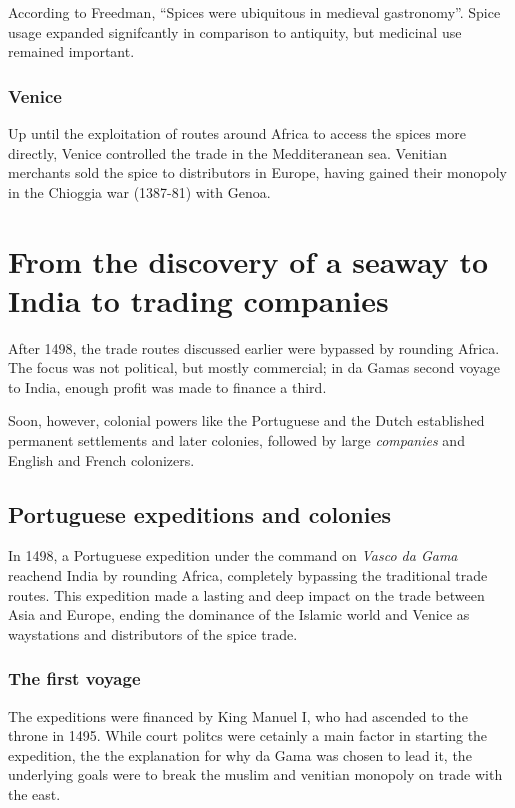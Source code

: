 \documentclass[11pt, a4paper, headings=standardclasses]{scrartcl}
\begin{document}
According to Freedman, ``Spices were ubiquitous in medieval gastronomy''.\autocite[3]{MST} Spice usage expanded signifcantly in comparison to antiquity, but medicinal use remained important.\autocite{RIS}

\subsubsection{Venice}

Up until the exploitation of routes around Africa to access the spices more directly, Venice controlled the trade in the Medditeranean sea. Venitian merchants sold the spice to distributors in Europe, having gained their monopoly in the Chioggia war (1387-81) with Genoa.\autocite{SpiceTrade}

\section{From the discovery of a seaway to India to trading companies}

After 1498, the trade routes discussed earlier were bypassed by rounding Africa. The focus was not political, but mostly commercial; in da Gamas second voyage to India, enough profit was made to finance a third.\autocite[Section \textit{The second voyage}]{Vasco}

Soon, however, colonial powers like the Portuguese and the Dutch established permanent settlements and later colonies, followed by large \emph{companies} and English and French colonizers.

\subsection{Portuguese expeditions and colonies}

In 1498, a Portuguese expedition under the command on \emph{Vasco da Gama} reachend India by rounding Africa, completely bypassing the traditional trade routes\autocite{VdG}. This expedition made a lasting and deep impact on the trade between Asia and Europe, ending the dominance of the Islamic world and Venice as waystations and distributors of the spice trade.\autocite{GLO}

\subsubsection{The first voyage}

The expeditions were financed by King Manuel I, who had ascended to the throne in 1495. While court politcs were cetainly a main factor in starting the expedition, the the explanation for why da Gama was chosen to lead it, the underlying goals were to break the muslim and venitian monopoly on trade with the east.\autocite{Vasco}
\end{document}
